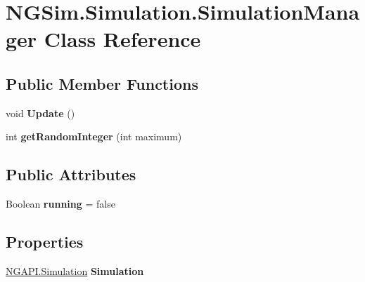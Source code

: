 \hypertarget{class_n_g_sim_1_1_simulation_1_1_simulation_manager}{}\section{N\+G\+Sim.\+Simulation.\+Simulation\+Manager Class Reference}
\label{class_n_g_sim_1_1_simulation_1_1_simulation_manager}
\subsection*{Public Member Functions}
\begin{DoxyCompactItemize}
\item 
\mbox{\label{class_n_g_sim_1_1_simulation_1_1_simulation_manager_a0d06f65c2f9db77f976fd15d2b10c96c}} 
void {\bfseries Update} ()
\item 
\mbox{\label{class_n_g_sim_1_1_simulation_1_1_simulation_manager_a3776b01cabeadc19c432985a422eca26}} 
int {\bfseries get\+Random\+Integer} (int maximum)
\end{DoxyCompactItemize}
\subsection*{Public Attributes}
\begin{DoxyCompactItemize}
\item 
\mbox{\label{class_n_g_sim_1_1_simulation_1_1_simulation_manager_acea197295a218c5bbc65b363dd9bd99c}} 
Boolean {\bfseries running} = false
\end{DoxyCompactItemize}
\subsection*{Properties}
\begin{DoxyCompactItemize}
\item 
\mbox{\label{class_n_g_sim_1_1_simulation_1_1_simulation_manager_a720158547b3ebb4a738458c13f3c3dd1}} 
\hyperlink{class_n_g_a_p_i_1_1_simulation}{N\+G\+A\+P\+I.\+Simulation} {\bfseries Simulation}
\end{DoxyCompactItemize}
